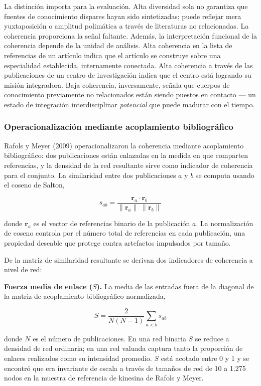 \documentclass[
]{article}
\begin{document}
La distinción importa para la evaluación. Alta diversidad sola no
garantiza que fuentes de conocimiento dispares hayan sido sintetizadas;
puede reflejar mera yuxtaposición o amplitud polimática a través de
literaturas no relacionadas. La coherencia proporciona la señal
faltante. Además, la interpretación funcional de la coherencia depende
de la unidad de análisis. Alta coherencia en la lista de referencias de
un artículo indica que el artículo se construye sobre una especialidad
establecida, internamente conectada. Alta coherencia a través de las
publicaciones de un centro de investigación indica que el centro está
logrando su misión integradora. Baja coherencia, inversamente, señala
que cuerpos de conocimiento previamente no relacionados están siendo
puestos en contacto --- un estado de integración interdisciplinar
\emph{potencial} que puede madurar con el tiempo.

\hypertarget{operacionalizaciuxf3n-mediante-acoplamiento-bibliogruxe1fico}{%
\subsubsection{Operacionalización mediante acoplamiento
bibliográfico}\label{operacionalizaciuxf3n-mediante-acoplamiento-bibliogruxe1fico}}

Rafols y Meyer (2009) operacionalizaron la coherencia mediante
acoplamiento bibliográfico: dos publicaciones están enlazadas en la
medida en que comparten referencias, y la densidad de la red resultante
sirve como indicador de coherencia para el conjunto. La similaridad
entre dos publicaciones \(a\) y \(b\) se computa usando el coseno de
Salton,

\[s_{ab} = \frac{\mathbf{r}_a \cdot \mathbf{r}_b}
               {\|\mathbf{r}_a\|\;\|\mathbf{r}_b\|}\]

donde \(\mathbf{r}_a\) es el vector de referencias binario de la
publicación \(a\). La normalización de coseno controla por el número
total de referencias en cada publicación, una propiedad deseable que
protege contra artefactos impulsados por tamaño.

De la matriz de similaridad resultante se derivan dos indicadores de
coherencia a nivel de red:

\textbf{Fuerza media de enlace (\(S\)).} La media de las entradas fuera
de la diagonal de la matriz de acoplamiento bibliográfico normalizada,

\[S = \frac{2}{N(N-1)} \sum_{a < b} s_{ab}\]

donde \(N\) es el número de publicaciones. En una red binaria \(S\) se
reduce a densidad de red ordinaria; en una red valuada captura tanto la
proporción de enlaces realizados como su intensidad promedio. \(S\) está
acotado entre 0 y 1 y se encontró que era invariante de escala a través
de tamaños de red de 10 a 1.275 nodos en la muestra de referencia de
kinesina de Rafols y Meyer.
\end{document}
